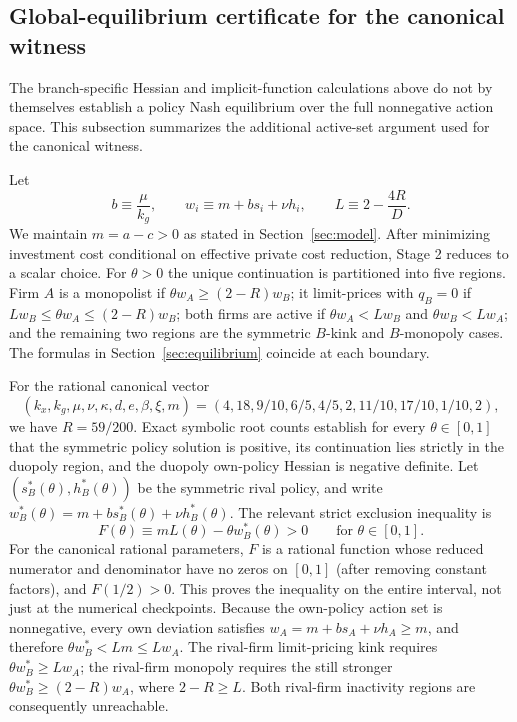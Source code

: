 \subsection{Global-equilibrium certificate for the canonical witness}
\label{app:global-equilibrium}

The branch-specific Hessian and implicit-function calculations above do not by themselves establish a policy Nash equilibrium over the full nonnegative action space. This subsection summarizes the additional active-set argument used for the canonical witness.

Let
\[
b\equiv\frac{\mu}{k_g},\qquad
w_i\equiv m+b s_i+\nu h_i,\qquad
L\equiv2-\frac{4R}{D}.
\]
We maintain $m=a-c>0$ as stated in Section~\ref{sec:model}. After minimizing investment cost conditional on effective private cost reduction, Stage 2 reduces to a scalar choice. For $\theta>0$ the unique continuation is partitioned into five regions. Firm $A$ is a monopolist if $\theta w_A\geq(2-R)w_B$; it limit-prices with $q_B=0$ if $Lw_B\leq\theta w_A\leq(2-R)w_B$; both firms are active if $\theta w_A<Lw_B$ and $\theta w_B<Lw_A$; and the remaining two regions are the symmetric $B$-kink and $B$-monopoly cases. The formulas in Section~\ref{sec:equilibrium} coincide at each boundary.

For the rational canonical vector
\[
(k_x,k_g,\mu,\nu,\kappa,d,e,\beta,\xi,m)
=(4,18,9/10,6/5,4/5,2,11/10,17/10,1/10,2),
\]
we have $R=59/200$. Exact symbolic root counts establish for every $\theta\in[0,1]$ that the symmetric policy solution is positive, its continuation lies strictly in the duopoly region, and the duopoly own-policy Hessian is negative definite. Let $(s_B^*(\theta),h_B^*(\theta))$ be the symmetric rival policy, and write $w_B^*(\theta)=m+b s_B^*(\theta)+\nu h_B^*(\theta)$. The relevant strict exclusion inequality is
\[
F(\theta)\equiv mL(\theta)-\theta w_B^*(\theta)>0
\qquad \text{for }\theta\in[0,1].
\]
For the canonical rational parameters, $F$ is a rational function whose reduced numerator and denominator have no zeros on $[0,1]$ (after removing constant factors), and $F(1/2)>0$. This proves the inequality on the entire interval, not just at the numerical checkpoints. Because the own-policy action set is nonnegative, every own deviation satisfies $w_A=m+bs_A+\nu h_A\geq m$, and therefore $\theta w_B^*<Lm\leq Lw_A$. The rival-firm limit-pricing kink requires $\theta w_B^*\geq Lw_A$; the rival-firm monopoly requires the still stronger $\theta w_B^*\geq(2-R)w_A$, where $2-R\geq L$. Both rival-firm inactivity regions are consequently unreachable.

